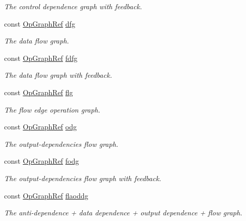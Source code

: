 \begin{DoxyCompactItemize}
\begin{DoxyCompactList}\small\item\em The control dependence graph with feedback. \end{DoxyCompactList}\item 
const \hyperlink{op__graph_8hpp_aee97c95c40f791b60c451d9e29c72d39}{Op\+Graph\+Ref} \hyperlink{classFunctionBehavior_a2d392926b155b2f78a147ae7d62e25a1}{dfg}
\begin{DoxyCompactList}\small\item\em The data flow graph. \end{DoxyCompactList}\item 
const \hyperlink{op__graph_8hpp_aee97c95c40f791b60c451d9e29c72d39}{Op\+Graph\+Ref} \hyperlink{classFunctionBehavior_a2e7529ea5dcdda96e2ea5cfab95abbd1}{fdfg}
\begin{DoxyCompactList}\small\item\em The data flow graph with feedback. \end{DoxyCompactList}\item 
const \hyperlink{op__graph_8hpp_aee97c95c40f791b60c451d9e29c72d39}{Op\+Graph\+Ref} \hyperlink{classFunctionBehavior_a30c5330e2065aa9e873d256ed6189aaa}{flg}
\begin{DoxyCompactList}\small\item\em The flow edge operation graph. \end{DoxyCompactList}\item 
const \hyperlink{op__graph_8hpp_aee97c95c40f791b60c451d9e29c72d39}{Op\+Graph\+Ref} \hyperlink{classFunctionBehavior_a906f25f24348a95251c279809e36115f}{odg}
\begin{DoxyCompactList}\small\item\em The output-\/dependencies flow graph. \end{DoxyCompactList}\item 
const \hyperlink{op__graph_8hpp_aee97c95c40f791b60c451d9e29c72d39}{Op\+Graph\+Ref} \hyperlink{classFunctionBehavior_a4fed02a22fd4d284b2241560af004bf0}{fodg}
\begin{DoxyCompactList}\small\item\em The output-\/dependencies flow graph with feedback. \end{DoxyCompactList}\item 
const \hyperlink{op__graph_8hpp_aee97c95c40f791b60c451d9e29c72d39}{Op\+Graph\+Ref} \hyperlink{classFunctionBehavior_a89f7615ad27b5306f19daababca9c43a}{flaoddg}
\begin{DoxyCompactList}\small\item\em The anti-\/dependence + data dependence + output dependence + flow graph. \end{DoxyCompactList}\item 

\end{DoxyCompactItemize}
